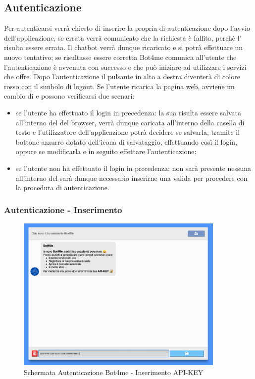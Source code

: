 \subsection{Autenticazione}
Per autenticarsi verrà chiesto di inserire la propria  di autenticazione dopo l'avvio dell'applicazione, se errata verrà comunicato che la richiesta è fallita, perchè l' risulta essere errata. Il chatbot verrà dunque ricaricato e si potrà effettuare un nuovo tentativo; se risultasse essere corretta Bot4me comunica all'utente che l'autenticazione è avvenuta con successo e che può iniziare ad utilizzare i servizi che offre. 
Dopo l'autenticazione il pulsante in alto a destra diventerà di colore rosso con il simbolo di logout.
Se l'utente ricarica la pagina web, avviene un cambio di  e possono verificarsi due scenari: 
\begin{itemize}
    \item se l'utente ha effettuato il login in precedenza: la sua  risulta essere salvata all'interno del  del browser, verrà dunque caricata all'interno della casella di testo e l'utilizzatore dell'applicazione potrà decidere se salvarla, tramite il bottone azzurro dotato dell'icona di salvataggio, effettuando così il login, oppure se modificarla e in seguito effettare l'autenticazione; 
    \item se l'utente non ha effettuato il login in precedenza: non sarà presente nessuna  all'interno del  sarà dunque necessario inserirne una valida per procedere con la procedura di autenticazione. 
\end{itemize}

\subsubsection{Autenticazione - Inserimento }
\begin{figure}[H]
    \centering\includegraphics[width=0.9\textwidth, height=0.7\textheight, keepaspectratio]{images/schermata_autenticazione.png}
    \caption{Schermata Autenticazione Bot4me - Inserimento API-KEY}
\end{figure}

